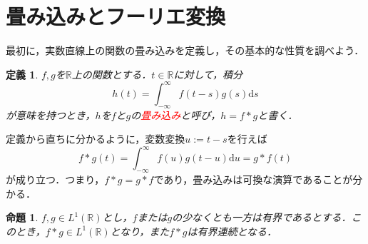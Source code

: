 \documentclass[a4j]{jsbook}
\newtheorem{prop}[theorem]{命題}
\newtheorem{definition}[theorem]{定義}
\numberwithin{theorem}{chapter}  %
\begin{document}
\section{畳み込みとフーリエ変換} \label{sec3-8}
最初に，実数直線上の関数の畳み込みを定義し，その基本的な性質を調べよう．
\begin{definition}
\label{def3-4}
\(f, g\)を\(\mathbb{R}\)上の関数とする．\(t\in\mathbb{R}\)に対して，積分
\begin{equation*}
    h(t)=\int_{-\infty}^\infty f(t-s)g(s)\mathrm{d}s
\end{equation*}
が意味を持つとき，\(h\)を\(f\)と\(g\)の\textcolor{red}{畳み込み}と呼び，\(h=f*g\)と書く．
\end{definition}
定義から直ちに分かるように，変数変換\(u:=t-s\)を行えば
\begin{equation*}
    f*g(t)=\int_{-\infty}^\infty f(u)g(t-u)\mathrm{d}u=g*f(t)
\end{equation*}
が成り立つ．つまり，\(f*g=g*f\)であり，畳み込みは可換な演算であることが分かる．
\begin{prop}
\label{prop3-13}
\(f, g\in L^1(\mathbb{R})\)とし，\(f\)または\(g\)の少なくとも一方は有界であるとする．このとき，\(f*g\in L^1(\mathbb{R})\)となり，また\(f*g\)は有界連続となる．
\end{prop}
\end{document}
